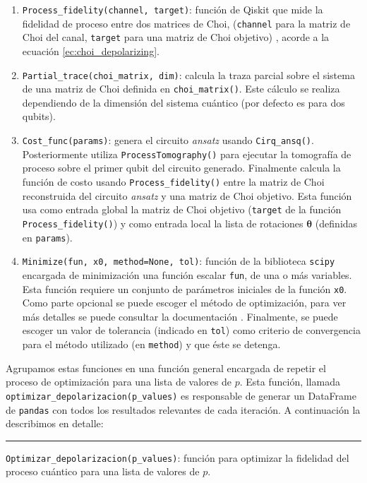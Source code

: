 \documentclass[letterpaper,12pt]{thesisECFM}
\theoremstyle{plain}
\theoremstyle{definition}
\theoremstyle{definition}
\theoremstyle{remark}
\newcommand{\1}{\mathbb{1}}
\begin{document}
\begin{enumerate}
    \item \texttt{Process\_fidelity(channel, target)}: función de Qiskit que
mide la fidelidad de proceso entre dos matrices de Choi, (\texttt{channel}
para la matriz de Choi del canal, \texttt{target} para una matriz de Choi
objetivo) \cite{Qiskit_documentation}, acorde a la ecuación
\ref{ec:choi_depolarizing}.
    \item \texttt{Partial\_trace(choi\_matrix, dim)}: calcula la traza parcial
sobre el sistema de una matriz de Choi definida en \texttt{choi\_matrix()}.
Este cálculo se realiza dependiendo de la dimensión del sistema cuántico (por
defecto es para dos qubits).
    \item \texttt{Cost\_func(params)}: genera el circuito \textit{ansatz} usando
\texttt{Cirq\_ansq()}. Posteriormente utiliza \texttt{ProcessTomography()} para
ejecutar la tomografía de proceso sobre el primer qubit del circuito generado.
Finalmente calcula la función de costo usando \texttt{Process\_fidelity()}
entre la matriz de Choi reconstruida del circuito \textit{ansatz} y una matriz de Choi
objetivo. Esta función usa como entrada global la matriz de Choi objetivo
(\texttt{target} de la función \texttt{Process\_fidelity()}) y como entrada
local la lista de rotaciones $\bm{\theta}$ (definidas en  \texttt{params}).
    \item \texttt{Minimize(fun, x0, method=None, tol)}: función de la biblioteca
\texttt{scipy} encargada de minimización una función escalar \texttt{fun}, de
una o más variables. Esta función requiere un conjunto de parámetros iniciales
de la función \texttt{x0}. Como parte opcional se puede escoger el método de
optimización, para ver más detalles se puede consultar la documentación \cite{scipy}. Finalmente, se puede escoger un valor de tolerancia
(indicado en \texttt{tol})  como criterio de convergencia para el método
utilizado (en \texttt{method}) y que éste se detenga.
\end{enumerate}

Agrupamos estas funciones en una función general encargada de repetir el
proceso de optimización para una lista de valores de $p$. Esta función, llamada
\texttt{optimizar\_depolarizacion(p\_values)} es responsable de generar un
DataFrame de \texttt{pandas} con todos los resultados relevantes de cada
iteración. A continuación la describimos en detalle:

\noindent\rule{\textwidth}{1mm}
\texttt{Optimizar\_depolarizacion(p\_values)}: función para optimizar la
fidelidad del proceso cuántico para una lista de valores de $p$. \newline
\end{document}
